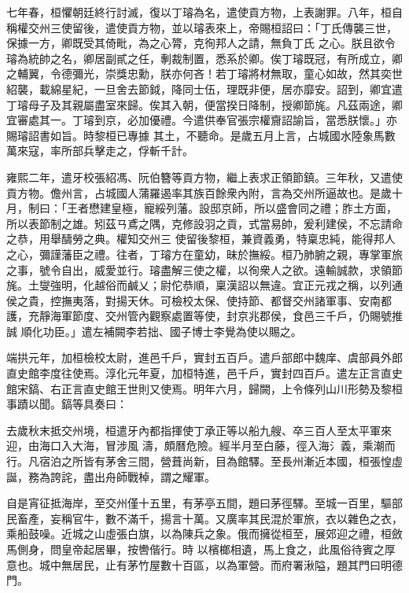 \begin{pinyinscope}
 七年春，桓懼朝廷終行討滅，復以丁璿為名，遣使貢方物，上表謝罪。八年，桓自稱權交州三使留後，遣使貢方物，並以璿表來上，帝賜桓詔曰：「丁氏傳襲三世，保據一方，卿既受其倚毗，為之心膂，克徇邦人之請，無負丁氏
 之心。朕且欲令璿為統帥之名，卿居副貳之任，剸裁制置，悉系於卿。俟丁璿既冠，有所成立，卿之輔翼，令德彌光，崇獎忠勳，朕亦何吝！若丁璿將材無取，童心如故，然其奕世紹襲，載綿星紀，一旦舍去節鉞，降同士伍，理既非便，居亦靡安。詔到，卿宜遣丁璿母子及其親屬盡室來歸。俟其入朝，便當揆日降制，授卿節旄。凡茲兩途，卿宜審處其一。丁璿到京，必加優禮。今遣供奉官張宗權齎詔諭旨，當悉朕懷。」亦賜璿詔書如旨。時黎桓已專據
 其土，不聽命。是歲五月上言，占城國水陸象馬數萬來寇，率所部兵擊走之，俘斬千計。



 雍熙二年，遣牙校張紹馮、阮伯簪等貢方物，繼上表求正領節鎮。三年秋，又遣使貢方物。儋州言，占城國人蒲羅遏率其族百餘衆內附，言為交州所逼故也。是歲十月，制曰：「王者懋建皇極，寵綏列藩。設邸京師，所以盛會同之禮；胙土方面，所以表節制之雄。矧茲ㄢ鳶之隅，克修設羽之貢，式當易帥，爰利建侯，不忘請命之恭，用舉醻勞之典。權知交州三
 使留後黎桓，兼資義勇，特稟忠純，能得邦人之心，彌謹藩臣之禮。往者，丁璿方在童幼，昧於撫綏。桓乃肺腑之親，專掌軍旅之事，號令自出，威愛並行。璿盡解三使之權，以徇衆人之欲。遠輸誠款，求領節旄。土燮強明，化越俗而鹹乂；尉佗恭順，稟漢詔以無違。宜正元戎之稱，以列通侯之貴，控撫夷落，對揚天休。可檢校太保、使持節、都督交州諸軍事、安南都護，充靜海軍節度、交州管內觀察處置等使，封京兆郡侯，食邑三千戶，仍賜號推誠
 順化功臣。」遣左補闕李若拙、國子博士李覺為使以賜之。



 端拱元年，加桓檢校太尉，進邑千戶，實封五百戶。遣戶部郎中魏庠、虞部員外郎直史館李度往使焉。淳化元年夏，加桓特進，邑千戶，實封四百戶。遣左正言直史館宋鎬、右正言直史館王世則又使焉。明年六月，歸闕，上令條列山川形勢及黎桓事蹟以聞。鎬等具奏曰：



 去歲秋末抵交州境，桓遣牙內都指揮使丁承正等以船九艘、卒三百人至太平軍來迎，由海口入大海，冒涉風
 濤，頗曆危險。經半月至白藤，徑入海氵義，乘潮而行。凡宿泊之所皆有茅舍三間，營葺尚新，目為館驛。至長州漸近本國，桓張惶虛誕，務為誇詫，盡出舟師戰棹，謂之耀軍。



 自是宵征抵海岸，至交州僅十五里，有茅亭五間，題曰茅徑驛。至城一百里，驅部民畜產，妄稱官牛，數不滿千，揚言十萬。又廣率其民混於軍旅，衣以雜色之衣，乘船鼓噪。近城之山虛張白旗，以為陳兵之象。俄而擁從桓至，展郊迎之禮，桓斂馬側身，問皇帝起居畢，按轡偕行。時
 以檳榔相遺，馬上食之，此風俗待賓之厚意也。城中無居民，止有茅竹屋數十百區，以為軍營。而府署湫隘，題其門曰明德門。




\end{pinyinscope}
